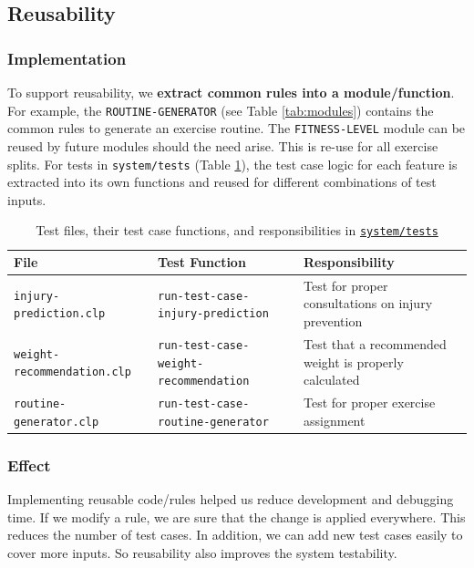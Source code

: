 \documentclass{article}
\begin{document}
\subsection{Reusability}

\subsubsection{Implementation}

To support reusability, we \textbf{extract common rules into a module/function}. For example, the \texttt{ROUTINE-GENERATOR} (see Table \ref{tab:modules}) contains the common rules to generate an exercise routine. The \texttt{FITNESS-LEVEL} module can be reused by future modules should the need arise. This is re-use for all exercise splits. For tests in \texttt{system/tests} (Table \ref{tab:tests}), the test case logic for each feature is extracted into its own functions and reused for different combinations of test inputs.

\begin{table}[h]
\centering
\begin{tabular}{|l|l|p{5cm}|}
\hline
\textbf{File} & \textbf{Test Function} & \textbf{Responsibility} \\
\hline
\texttt{injury-prediction.clp} & \texttt{run-test-case-injury-prediction} & Test for proper consultations on injury prevention \\
\hline
\texttt{weight-recommendation.clp} & \texttt{run-test-case-weight-recommendation} & Test that a recommended weight is properly calculated \\
\hline
\texttt{routine-generator.clp} & \texttt{run-test-case-routine-generator} & Test for proper exercise assignment \\
\hline
\end{tabular}
\caption{Test files, their test case functions, and responsibilities in \href{https://github.com/joshpham97/COMP474Project_OptionB_PhamTran_ExerciseRecommender/tree/main/system/tests}{\texttt{system/tests}}}
\label{tab:tests}
\end{table}


\subsubsection{Effect}

Implementing reusable code/rules helped us reduce development and debugging time. If we modify a rule, we are sure that the change is applied everywhere. This reduces the number of test cases. In addition, we can add new test cases easily to cover more inputs. So reusability also improves the system testability.
\end{document}

